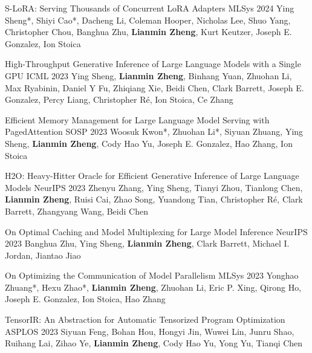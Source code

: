 \begin{cventries}
	
	\cventry
	{}
	{S-LoRA: Serving Thousands of Concurrent LoRA Adapters} %
	{MLSys 2024} %
	{} %
	{Ying Sheng*, Shiyi Cao*, Dacheng Li, Coleman Hooper, Nicholas Lee, Shuo Yang, Christopher Chou, Banghua Zhu, \textbf{Lianmin Zheng}, Kurt Keutzer, Joseph E. Gonzalez, Ion Stoica}

	\cventry
	{}
	{High-Throughput Generative Inference of Large Language Models with a Single GPU} %
	{ICML 2023} %
	{} %
	{Ying Sheng, \textbf{Lianmin Zheng}, Binhang Yuan, Zhuohan Li, Max Ryabinin, Daniel Y Fu, Zhiqiang Xie, Beidi Chen, Clark Barrett, Joseph E. Gonzalez, Percy Liang, Christopher Ré, Ion Stoica, Ce Zhang}

	\cventry
	{}
	{Efficient Memory Management for Large Language Model Serving with PagedAttention} %
	{SOSP 2023} %
	{} %
	{Woosuk Kwon*, Zhuohan Li*, Siyuan Zhuang, Ying Sheng, \textbf{Lianmin Zheng}, Cody Hao Yu, Joseph E. Gonzalez, Hao Zhang, Ion Stoica}
	
	\cventry
	{}
	{H2O: Heavy-Hitter Oracle for Efficient Generative Inference of Large Language Models} %
	{NeurIPS 2023} %
	{} %
	{Zhenyu Zhang, Ying Sheng, Tianyi Zhou, Tianlong Chen, \textbf{Lianmin Zheng}, Ruisi Cai, Zhao Song, Yuandong Tian, Christopher Ré, Clark Barrett, Zhangyang Wang, Beidi Chen}
	
	\cventry
	{}
	{On Optimal Caching and Model Multiplexing for Large Model Inference} %
	{NeurIPS 2023} %
	{} %
	{Banghua Zhu, Ying Sheng, \textbf{Lianmin Zheng}, Clark Barrett, Michael I. Jordan, Jiantao Jiao}
	
	\cventry
	{}
	{On Optimizing the Communication of Model Parallelism} %
	{MLSys 2023} %
	{} %
	{Yonghao Zhuang*, Hexu Zhao*, \textbf{Lianmin Zheng}, Zhuohan Li, Eric P. Xing, Qirong Ho, Joseph E. Gonzalez, Ion Stoica, Hao Zhang}
	
	\cventry
	{}
	{TensorIR: An Abstraction for Automatic Tensorized Program Optimization} %
	{ASPLOS 2023} %
	{} %
	{Siyuan Feng, Bohan Hou, Hongyi Jin, Wuwei Lin, Junru Shao, Ruihang Lai, Zihao Ye, \textbf{Lianmin Zheng}, Cody Hao Yu, Yong Yu, Tianqi Chen}
	

\end{cventries}
